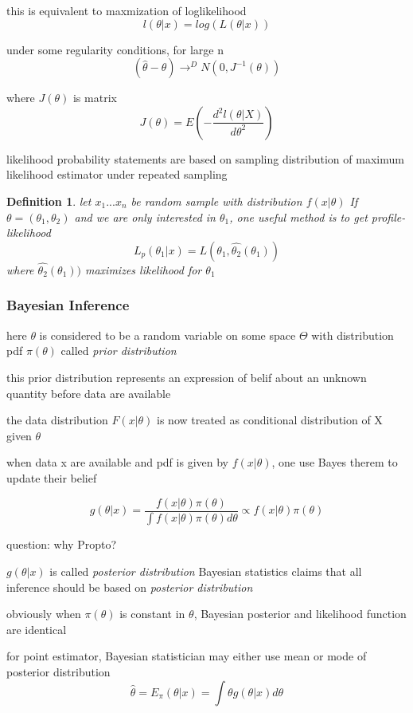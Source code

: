 \documentclass[10pt]{article}
\theoremstyle{break}
\newtheorem{defn}{Definition}[subsection]
\begin{document}
this is equivalent to maxmization of loglikelihood
$$l(\theta|x) = log(L(\theta|x))$$

under some regularity conditions, for large n
$$(\hat{\theta}-\theta)\rightarrow^DN(0,J^{-1}(\theta))$$

where $J(\theta)$ is matrix $$J(\theta)=E\left(-\frac{d^2l(\theta|X)}{d\theta^2}\right)$$

likelihood probability statements are based on sampling distribution of maximum likelihood estimator under repeated sampling

\begin{defn}
    let $x_1 ... x_n$ be random sample with distribution $f(x|\theta)$
    If $\theta=(\theta_1, \theta_2)$ and we are only interested in $\theta_1$,
    one useful method is to get profile-likelihood
    $$L_p(\theta_1|x)=L(\theta_1, \hat{\theta_2}(\theta_1))$$
    where $\hat{\theta_2}(\theta_1))$ maximizes likelihood for $\theta_1$
\end{defn}

\subsubsection{Bayesian Inference}
here $\theta$ is considered to be a random variable on some space $\Theta$
with distribution pdf $\pi(\theta)$ called \emph{prior distribution}

this prior distribution represents an expression of belif about an unknown quantity before data are available

the data distribution $F(x|\theta)$ is now treated as conditional distribution of X given $\theta$

when data x are available and pdf is given by $f(x|\theta)$, one use Bayes therem to update their belief

$$g(\theta|x) = \frac{f(x|\theta)\pi(\theta)}
{\int f(x|\theta)\pi(\theta)d\theta} 
\propto f(x|\theta)\pi(\theta)$$

question: why Propto?

$g(\theta|x)$ is called \emph{posterior distribution}
Bayesian statistics claims that all inference should be based on \emph{posterior distribution}

obviously when $\pi(\theta)$ is constant in $\theta$, Bayesian posterior and likelihood function are identical

for point estimator, Bayesian statistician may either use mean or mode of posterior distribution 
$$\hat\theta=E_\pi(\theta|x)=\int \theta g(\theta|x)d\theta$$
\end{document}
